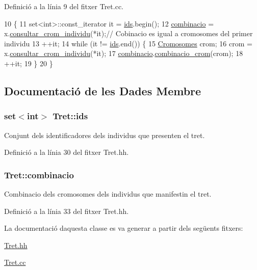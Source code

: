 Definició a la línia 9 del fitxer Tret.\+cc.


\begin{DoxyCode}
10 \{
11   set<int>::const\_iterator it = \hyperlink{class_tret_a918c15168c43121f4d2c1737165b607c}{ids}.begin();
12   \hyperlink{class_tret_aa3cd7d694d507642466ccba3fe92a077}{combinacio} = x.\hyperlink{class_cjt__individus_a5c98261f78513b1b008cead471d8afa5}{consultar\_crom\_individu}(*it);\textcolor{comment}{// Cobinacio es igual a
       cromosomes del primer individu}
13   ++it;
14   \textcolor{keywordflow}{while} (it != \hyperlink{class_tret_a918c15168c43121f4d2c1737165b607c}{ids}.end()) \{
15     \hyperlink{class_cromosomes}{Cromosomes} crom;
16     crom = x.\hyperlink{class_cjt__individus_a5c98261f78513b1b008cead471d8afa5}{consultar\_crom\_individu}(*it);
17     \hyperlink{class_tret_aa3cd7d694d507642466ccba3fe92a077}{combinacio}.\hyperlink{class_cromosomes_a3453b58fad109a8317018f8349852d55}{combinacio\_crom}(crom);
18     ++it;
19   \}
20 \}
\end{DoxyCode}


\subsection{Documentació de les Dades Membre}
\subsubsection[{\texorpdfstring{ids}{ids}}]{\setlength{\rightskip}{0pt plus 5cm}set$<$int$>$ Tret\+::ids\hspace{0.3cm}{\ttfamily [private]}}\hypertarget{class_tret_a918c15168c43121f4d2c1737165b607c}{}\label{class_tret_a918c15168c43121f4d2c1737165b607c}


Conjunt dels identificadores dels individus que presenten el tret. 



Definició a la línia 30 del fitxer Tret.\+hh.

\subsubsection[{\texorpdfstring{combinacio}{combinacio}}]{ Tret\+::combinacio\hspace{0.3cm}{\ttfamily [private]}}\hypertarget{class_tret_aa3cd7d694d507642466ccba3fe92a077}{}\label{class_tret_aa3cd7d694d507642466ccba3fe92a077}


Combinacio dels cromosomes dels individus que manifestin el tret. 



Definició a la línia 33 del fitxer Tret.\+hh.



La documentació d\textquotesingle{}aquesta classe es va generar a partir dels següents fitxers\+:\begin{DoxyCompactItemize}
\item 
\hyperlink{_tret_8hh}{Tret.\+hh}\item 
\hyperlink{_tret_8cc}{Tret.\+cc}\end{DoxyCompactItemize}
